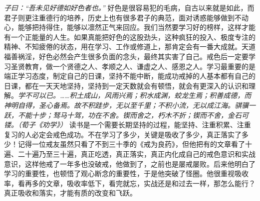 \textit{子曰：“吾未见好德如好色者也。”} 好色是很容易犯的毛病，自古以来就是如此，而君子则更注重德行的培养，历史上也有很多君子的典范，面对诱惑能够做到不动心，能够把持得住，能够以凛然正气来回应。我们当然要学习好的榜样，这样才能有一个正能量的人生。如果真能把好色的这股劲头，这种疯狂的投入、极度专注的精神、不知疲倦的状态，用在学习、工作或修道上，那肯定会有一番大成就。天道福善祸淫，好色必然会产生很多负面的念头，最终其实害了自己。戒色后一定要学习圣贤教育，做一个贤德之人、孝顺之人、谦虚之人、感恩之人。学习最重要的是端正学习态度，制定自己的日课，坚持不能中断，能成功戒掉的人基本都有自己的日课，都在一天天地坚持，坚持到一定天数就会有顿悟，就会有更深入的认识和理解。\textit{学不可以已。……积土成山，风雨兴焉；积水成渊，蛟龙生焉；积善成德，而神明自得，圣心备焉。故不积跬步，无以至千里；不积小流，无以成江海。骐骥一跃，不能十步；驽马十驾，功在不舍。锲而舍之，朽木不折；锲而不舍，金石可镂。（荀子《劝学》）} 读书是一个需要长期坚持的过程，能坚持、注重积累、注重复习的人必定会戒色成功。不在学习了多少，关键是吸收了多少，真正落实了多少！记得一位戒友虽然只看了不到三十季的《戒为良药》，但他把有的文章看了十遍、二十遍乃至三十遍，真正吃透，真正落实，真正内化成自己的戒色意识和实战意识，这样他戒了一年多也没破戒，他做到了，之前也是屡戒屡败。后来他明白了学习的重要性，也顿悟了观心断念的重要性，于是他突破了怪圈。他很重视吸收率，看再多的文章，吸收率低下，看完就忘，实战还是和过去一样，那怎么能行？真正吸收和落实，才能有质的改变和飞跃。

